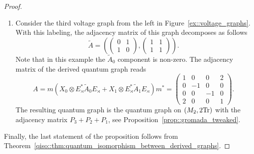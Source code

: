 \documentclass{amsart}
\theoremstyle{definition}
\theoremstyle{definition}
\begin{document}
\begin{proof}
\begin{enumerate}
\item Consider the third voltage graph from the left in Figure~\ref{ex::voltage_graphs}. With this labeling, the adjacency matrix of this graph decomposes as follows
\[
\tilde{A}=\left(\begin{pmatrix}0 & 1\\ 1 & 0\end{pmatrix},\begin{pmatrix}1 & 1\\ 1 & 1\end{pmatrix}\right).
\]
Note that in this example the $\tilde{A}_0$ component is non-zero. The adjacency matrix of the derived quantum graph reads
\[
A=m(X_0\otimes E^*_\rtimes\tilde{A}_0E_\rtimes+X_1\otimes E^*_\rtimes \tilde{A}_1E_\rtimes)m^*=\begin{pmatrix}1 & 0 & 0 & 2\\ 0 & -1 & 0 & 0\\ 0 & 0 & -1 & 0\\ 2 & 0 & 0 & 1\end{pmatrix}.
\]
The resulting quantum graph is the quantum graph on $(M_2,2{\rm Tr})$ with the adjacency matrix $P_3+P_2+P_1$, see Proposition~\ref{prop::gromada_tweaked}. 
\end{enumerate}
Finally, the last statement of the proposition follows from Theorem~\ref{qiso::thm:quantum_isomorphism_between_derived_graphs}.
\end{proof}
\end{document}
